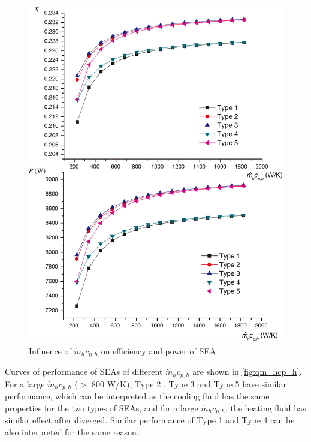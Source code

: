 \begin{figure}[htbp]
\centering
	\includegraphics[width = 0.7\columnwidth]{fig/qm_hcp_h}
	\caption{Influence of $\dot{m}_hc_{p,h}$ on efficiency and power of SEA}
	\label{fig:qm_hcp_h}
\end{figure}

Curves of performance of SEAs of different $\dot{m}_hc_{p,h}$ are shown in \autoref{fig:qm_hcp_h}.
For a large $\dot{m}_hc_{p,h}$ ($>$ 800 W/K), Type 2 , Type 3 and Type 5 have similar performance, which can be interpreted as the cooling fluid has the same properties for the two types of SEAs, and for a large $\dot{m}_hc_{p,h}$, the heating fluid has similar effect after diverged. Similar performance of Type 1 and Type 4 can be also interpreted for the same reason.

